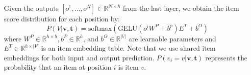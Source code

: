 Given the outputs $[{o}^1, ..., o^N] \in \mathbb{R}^{N \times h}$ from the last layer, we obtain the item score distribution for each position by:
\begin{equation}
    P\left(V | \mathbf{v}, \mathbf{t}\right) = \text{softmax}(\text{GELU}(o^{i}W^P + b^p) E^T + b^O)
\end{equation}
where $W^P \in \mathbb{R}^{h \times h}, b^P \in \mathbb{R}^{h}$, and $b^O \in \mathbb{R}^{|V|}$ are learnable parameters and $E^T \in \mathbb{R}^{h \times |V|}$ is an item embedding table. Note that we use shared item embeddings for both input and output prediction. $P\left(v_i = v | \mathbf{v}, \mathbf{t}\right)$ represents the probability that an item at position $i$ is item $v$.
